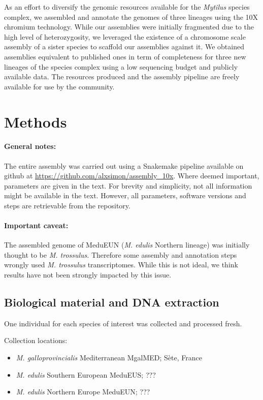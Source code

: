 \documentclass[11pt, a4paper]{article}
\begin{document}
As an effort to diversify the genomic resources available for the \textit{Mytilus} species complex,
we assembled and annotate the genomes of three lineages using the 10X chromium technology.
While our assemblies were initially fragmented due to the high level of heterozygosity,
we leveraged the existence of a chromosome scale assembly of a sister species to scaffold our assemblies against it.
We obtained assemblies equivalent to published ones in term of completeness for three new lineages of the species complex using a low sequencing budget and publicly available data.
The resources produced and the assembly pipeline are freely available for use by the community.

\section{Methods}\label{methods}

\paragraph{General notes:}
The entire assembly was carried out using a Snakemake \parencite{Molder2021} pipeline available on github at \url{https://github.com/alxsimon/assembly_10x}.
Where deemed important, parameters are given in the text.
For brevity and simplicity, not all information might be available in the text.
However, all parameters, software versions and steps are retrievable from the repository.

\paragraph{Important caveat:}
The assembled genome of MeduEUN (\textit{M. edulis} Northern lineage) was initially thought to be \textit{M. trossulus}.
Therefore some assembly and annotation steps wrongly used \textit{M. trossulus} transcriptomes.
While this is not ideal, we think results have not been strongly impacted by this issue.


\subsection{Biological material and DNA extraction}

One individual for each species of interest was collected and processed fresh.

Collection locations:
\begin{itemize}
	\item \emph{M. galloprovincialis} Mediterranean MgalMED; Sète, France
	\item \emph{M. edulis} Southern European MeduEUS; ???
	\item \emph{M. edulis} Northern Europe MeduEUN; ???
\end{itemize}
\end{document}
